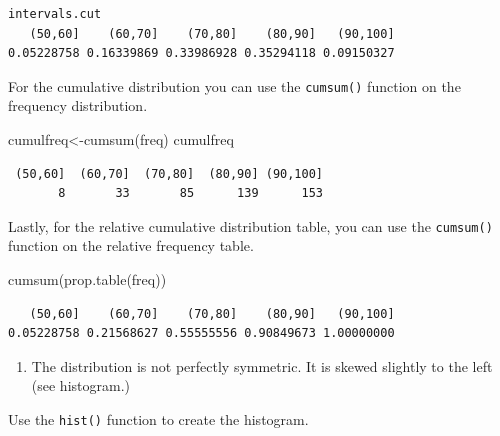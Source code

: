 \documentclass[
  letterpaper,
  DIV=11,
  numbers=noendperiod]{scrreprt}
\newenvironment{Shaded}{\begin{snugshade}}{\end{snugshade}}
\newcommand{\AttributeTok}[1]{\textcolor[rgb]{0.40,0.45,0.13}{#1}}
\newcommand{\ConstantTok}[1]{\textcolor[rgb]{0.56,0.35,0.01}{#1}}
\newcommand{\FunctionTok}[1]{\textcolor[rgb]{0.28,0.35,0.67}{#1}}
\newcommand{\NormalTok}[1]{\textcolor[rgb]{0.00,0.23,0.31}{#1}}
\newcommand{\OtherTok}[1]{\textcolor[rgb]{0.00,0.23,0.31}{#1}}
\newcommand{\SpecialCharTok}[1]{\textcolor[rgb]{0.37,0.37,0.37}{#1}}
\newcommand{\StringTok}[1]{\textcolor[rgb]{0.13,0.47,0.30}{#1}}
\providecommand{\tightlist}{%
  \setlength{\itemsep}{0pt}\setlength{\parskip}{0pt}}\usepackage{longtable,booktabs,array}
\begin{document}
\begin{verbatim}
intervals.cut
   (50,60]    (60,70]    (70,80]    (80,90]   (90,100] 
0.05228758 0.16339869 0.33986928 0.35294118 0.09150327 
\end{verbatim}

For the cumulative distribution you can use the \texttt{cumsum()}
function on the frequency distribution.

\begin{Shaded}
\begin{Highlighting}[numbers=left,,]
\NormalTok{cumulfreq}\OtherTok{\textless{}{-}}\FunctionTok{cumsum}\NormalTok{(freq)}
\NormalTok{cumulfreq}
\end{Highlighting}
\end{Shaded}

\begin{verbatim}
 (50,60]  (60,70]  (70,80]  (80,90] (90,100] 
       8       33       85      139      153 
\end{verbatim}

Lastly, for the relative cumulative distribution table, you can use the
\texttt{cumsum()} function on the relative frequency table.

\begin{Shaded}
\begin{Highlighting}[numbers=left,,]
\FunctionTok{cumsum}\NormalTok{(}\FunctionTok{prop.table}\NormalTok{(freq))}
\end{Highlighting}
\end{Shaded}

\begin{verbatim}
   (50,60]    (60,70]    (70,80]    (80,90]   (90,100] 
0.05228758 0.21568627 0.55555556 0.90849673 1.00000000 
\end{verbatim}

\begin{blackbox}

\begin{enumerate}
\def\labelenumi{\arabic{enumi}.}
\setcounter{enumi}{2}
\tightlist
\item
  The distribution is not perfectly symmetric. It is skewed slightly to
  the left (see histogram.)
\end{enumerate}

\end{blackbox}

Use the \texttt{hist()} function to create the histogram.

\begin{Shaded}
\end{Shaded}
\end{document}
